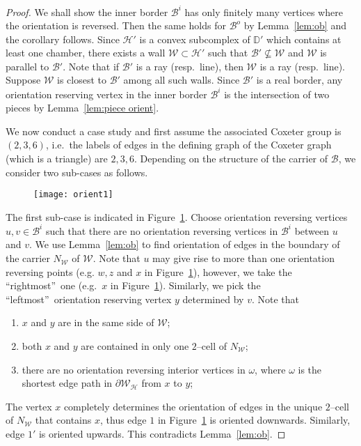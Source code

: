 \documentclass[11pt]{amsart}
\newcommand {\B}{\mathcal B}
\newcommand {\D}{\mathbb D}
\newcommand {\h}{\mathcal H}
\newcommand {\W}{\mathcal W}
\theoremstyle{definition}
\begin{document}
\begin{proof}
We shall show the inner border $\B^i$ has only finitely many vertices where the orientation is reversed. Then the same holds for $\B^o$ by Lemma~\ref{lem:ob} and the corollary follows. Since $\h'$ is a convex subcomplex of $\D'$ which contains at least one chamber, there exists a wall $\W\subset\h'$ such that $\B'\nsubseteq \W$  and $\W$ is parallel to $\B'$. Note that if $\B'$ is a ray (resp.\ line), then $\W$ is a ray (resp.\ line). Suppose $\W$ is closest to $\B'$ among all such walls. Since $\B'$ is a real border, any orientation reserving vertex in the inner border $\B^i$ is the intersection of two pieces by Lemma~\ref{lem:piece orient}. 

We now conduct a case study and first assume the associated Coxeter group is $(2,3,6)$, i.e.\ the labels of edges in the defining graph of the Coxeter graph (which is a triangle) are $2,3,6$. Depending on the structure of the carrier of $\B$, we consider two sub-cases as follows. 

\begin{figure}[h!]
	\centering
	\texttt{[image: orient1]}
	\caption{}
	\label{f:orient1}
\end{figure}

The first sub-case is indicated in Figure~\ref{f:orient1}. Choose orientation reversing vertices $u,v\in \B^i$ such that there are no orientation reversing vertices in $\B^i$ between $u$ and $v$. We use Lemma~\ref{lem:ob} to find orientation of edges in the boundary of the carrier $N_\W$ of $\W$. Note that $u$ may give rise to more than one orientation reversing points (e.g. $w,z$ and $x$ in Figure~\ref{f:orient1}), however, we take the \textquotedblleft rightmost\textquotedblright\ one (e.g.\ $x$ in Figure~\ref{f:orient1}). Similarly, we pick the \textquotedblleft leftmost\textquotedblright\ orientation reserving vertex $y$ determined by $v$. Note that
\begin{enumerate}
	\item $x$ and $y$ are in the same side of $\W$;
	\item both $x$ and $y$ are contained in only one $2$--cell of $N_\W$;
	\item there are no orientation reversing interior vertices in $\omega$, where $\omega$ is the shortest edge path in $\partial \W_\h$ from $x$ to $y$;
\end{enumerate}
The vertex $x$ completely determines the orientation of edges in the unique $2$--cell of $N_\W$ that contains $x$, thus edge $1$ in Figure~\ref{f:orient1} is oriented downwards. Similarly, edge $1'$ is oriented upwards. This contradicts Lemma~\ref{lem:ob}.


\end{proof}
\end{document}
